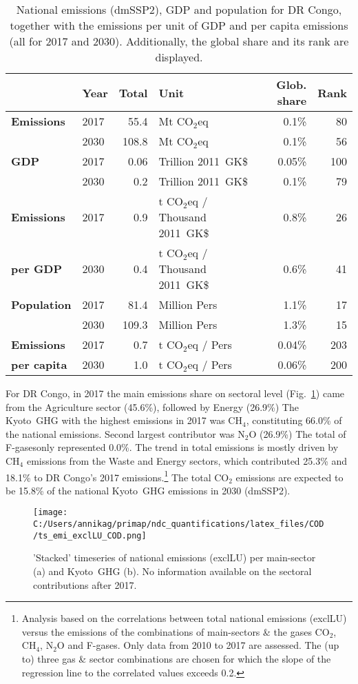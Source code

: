\documentclass[12pt]{article}
\begin{document}
 \begin{table}[H]
 \centering
 \caption{National emissions (dmSSP2), GDP and population for DR Congo, together with the emissions per unit of GDP and per capita emissions (all for 2017 and 2030). 
 Additionally, the global share and its rank are displayed.}
 \label{tab:overview}
 \begin{tabular}{l || l r l r r}
 \bfseries  & \bfseries Year & \bfseries Total & \bfseries Unit & \bfseries Glob. share & \bfseries Rank \tabularnewline \hline \hline
 \bfseries Emissions & 2017 & 55.4 & Mt CO$_2$eq & 0.1\% & 80 \tabularnewline 
 \bfseries  & 2030 & 108.8 & Mt CO$_2$eq & 0.1\% & 56 \tabularnewline \hline
 \bfseries GDP & 2017 & 0.06 & Trillion 2011~GK\$ & 0.05\% & 100 \tabularnewline 
 \bfseries  & 2030 & 0.2 & Trillion 2011~GK\$ & 0.1\% & 79 \tabularnewline \hline
 \bfseries Emissions & 2017 & 0.9 & t CO$_2$eq / Thousand 2011~GK\$ & 0.8\% & 26 \tabularnewline 
 \bfseries per GDP & 2030 & 0.4 & t CO$_2$eq / Thousand 2011~GK\$ & 0.6\% & 41 \tabularnewline \hline
 \bfseries Population & 2017 & 81.4 & Million Pers & 1.1\% & 17 \tabularnewline 
 \bfseries  & 2030 & 109.3 & Million Pers & 1.3\% & 15 \tabularnewline \hline
 \bfseries Emissions & 2017 & 0.7 & t CO$_2$eq /  Pers & 0.04\% & 203 \tabularnewline 
 \bfseries per capita & 2030 & 1.0 & t CO$_2$eq /  Pers & 0.06\% & 200 \tabularnewline 
 \end{tabular}
 \end{table}

 For DR Congo, in 2017 the main emissions share on sectoral level (Fig.~\ref{fig:tsEmi}) came from the Agriculture sector (45.6\%), followed by Energy (26.9\%)
 The Kyoto~GHG with the highest emissions in 2017 was CH$_4$, constituting  66.0\% of the national emissions. 
 Second largest contributor was N$_2$O (26.9\%)
 The total of F-gasesonly represented 0.0\%.
 The trend in total emissions is mostly driven by CH$_4$ emissions from the Waste and Energy sectors, which contributed 25.3\% and 18.1\% to DR Congo's 2017 emissions.\footnote{Analysis based on the correlations between total national emissions (exclLU) versus the emissions of the combinations of main-sectors \& the gases CO$_2$, CH$_4$, N$_2$O and F-gases. 
 Only data from 2010 to 2017 are assessed. 
 The (up to) three gas \& sector combinations are chosen for which the slope of the regression line to the correlated values exceeds 0.2.}
 The total CO$_2$ emissions are expected to be 15.8\% of the national Kyoto~GHG emissions in 2030 (dmSSP2).

 \begin{figure}[H]
 \centering
 \texttt{[image: C:/Users/annikag/primap/ndc\_quantifications/latex\_files/COD/ts\_emi\_exclLU\_COD.png]}
 \caption{'Stacked' timeseries of national emissions (exclLU) per main-sector (a) and Kyoto~GHG (b). 
 No information available on the sectoral contributions after 2017.}
 \label{fig:tsEmi}
 \end{figure}
\end{document}
